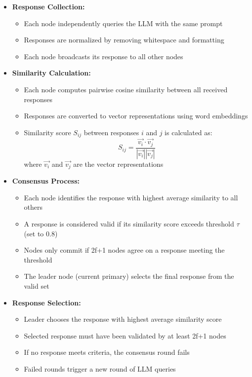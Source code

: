 \documentclass[12pt]{article}
\begin{document}
\begin{itemize}
    \item \textbf{Response Collection:}
    \begin{itemize}
        \item Each node independently queries the LLM with the same prompt
        \item Responses are normalized by removing whitespace and formatting
        \item Each node broadcasts its response to all other nodes
    \end{itemize}

    \item \textbf{Similarity Calculation:}
    \begin{itemize}
        \item Each node computes pairwise cosine similarity between all received responses
        \item Responses are converted to vector representations using word embeddings
        \item Similarity score $S_{ij}$ between responses $i$ and $j$ is calculated as:
        \[ S_{ij} = \frac{\vec{v_i} \cdot \vec{v_j}}{|\vec{v_i}| |\vec{v_j}|} \]
        where $\vec{v_i}$ and $\vec{v_j}$ are the vector representations
    \end{itemize}

    \item \textbf{Consensus Process:}
    \begin{itemize}
        \item Each node identifies the response with highest average similarity to all others
        \item A response is considered valid if its similarity score exceeds threshold $\tau$ (set to 0.8)
        \item Nodes only commit if 2f+1 nodes agree on a response meeting the threshold
        \item The leader node (current primary) selects the final response from the valid set
    \end{itemize}

    \item \textbf{Response Selection:}
    \begin{itemize}
        \item Leader chooses the response with highest average similarity score
        \item Selected response must have been validated by at least 2f+1 nodes
        \item If no response meets criteria, the consensus round fails
        \item Failed rounds trigger a new round of LLM queries
    \end{itemize}
\end{itemize}
\end{document}
